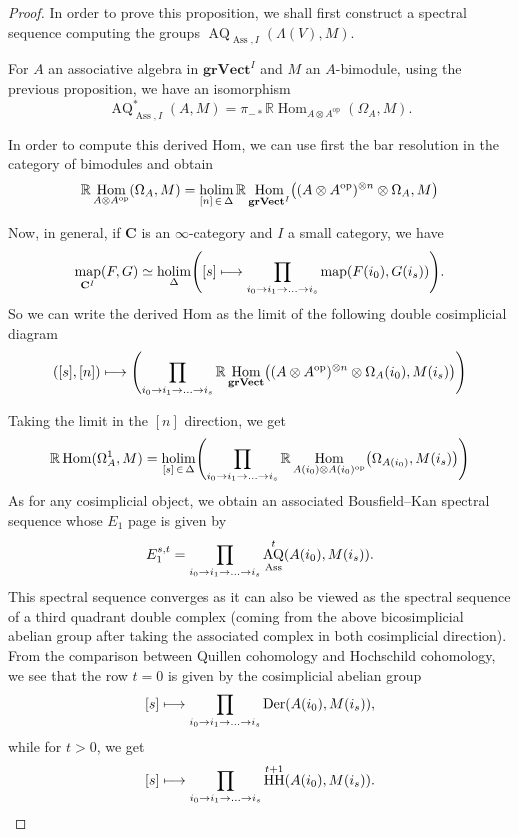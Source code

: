 \documentclass[AHL,Unicode,longabstracts,published]{cedram}
\DeclareMathOperator{\opp}{op}
\DeclareMathOperator{\Ass}{Ass}
\DeclareMathOperator{\holim}{holim}
\DeclareMathOperator{\Hom}{Hom}
\DeclareMathOperator{\mapp}{map}
\DeclareMathOperator{\HH}{HH}
\DeclareMathOperator{\Der}{Der}
\DeclareMathOperator{\AQ}{AQ}
\newcommand{\grVect}{\mathbf{grVect}}
\newcommand{\bfC}{\mathbf{C}}
\newcommand{\RR}{\mathbb{R}}
\renewcommand*{\to}{\mathchoice{\longrightarrow}{\rightarrow}{\rightarrow}{\rightarrow}}
\let\oldmapsto\mapsto
\renewcommand*{\mapsto}{\mathchoice{\longmapsto}{\oldmapsto}{\oldmapsto}{\oldmapsto}}
\let\originalleft\left
\let\originalright\right
\renewcommand{\left}{\mathopen{}\mathclose\bgroup\originalleft}
\renewcommand{\right}{\aftergroup\egroup\originalright}
\begin{document}
\begin{proof}
In order to prove this proposition, we shall first construct a spectral sequence computing the groups $\AQ_{\Ass,I}(\Lambda(V),M)$.



For $A$ an associative algebra in $\grVect^I$ and $M$ an $A$-bimodule, using the previous proposition, we have an isomorphism
\[
\AQ^*_{\Ass,I}(A,M)=\pi_{-*}\RR\Hom_{A\otimes A^{\opp}}(\Omega_A,M).
\]

In order to compute this derived Hom, we can use first the bar resolution in the category of bimodules and obtain
\[
\RR\Hom_{A\otimes A^{\opp}}(\Omega_A,M)=\holim_{[n]\,\in\,\Delta}\RR\Hom_{\grVect^I}\left((A\otimes A^{\opp})^{\otimes n}\otimes\Omega_A,M\right)
\]



Now, in general, if $\bfC$ is an $\infty$-category and $I$ a small category, we have
\[
\mapp_{\bfC^I}(F,G)\simeq\holim_{\Delta}\left([s]\mapsto\prod_{i_0\to i_1\to\ldots\to i_s} \mapp(F(i_0),G(i_s))\right).
\]
So we can write the derived Hom as the limit of the following double cosimplicial diagram
\[
([s],[n])\mapsto \left(\prod_{i_0\to i_1\to\ldots\to i_s}\RR\Hom_{\grVect}\bigl((A\otimes A^{\opp})^{\otimes n}\otimes\Omega_A(i_0),M(i_s)\bigr)\right)
\]


Taking the limit in the $[n]$ direction, we get
\[
\RR\Hom(\Omega_A^1,M)=\holim_{[s]\,\in\,\Delta}\left(\prod_{i_0\to i_1\to\ldots\to i_s}\RR\Hom_{A(i_0)\otimes A(i_0)^{\opp}}\left(\Omega_{A(i_0)},M(i_s)\right)\right)
\]
As for any cosimplicial object, we obtain an associated Bousfield--Kan spectral sequence whose $E_1$ page is given by
\[
E_1^{s,t}=\prod_{i_0\to i_1\to\ldots\to i_s}\AQ^{t}_{\Ass}(A(i_0),M(i_s)).
\]
This spectral sequence converges as it can also be viewed as the spectral sequence of a third quadrant double complex (coming from the above bicosimplicial abelian group after taking the associated complex in both cosimplicial direction). From the comparison between Quillen cohomology and Hochschild cohomology, we see that the row $t=0$ is given by the cosimplicial abelian group
\[
[s]\mapsto \prod_{i_0\to i_1\to\ldots\to i_s}\Der(A(i_0),M(i_s)),
\]
while for $t>0$, we get
\[
[s]\mapsto \prod_{i_0\to i_1\to\ldots\to i_s}\HH^{t+1}(A(i_0),M(i_s)).
\]


\end{proof}
\end{document}
